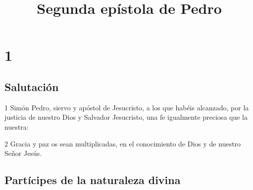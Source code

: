 
\title{Segunda epístola de Pedro}

\chapter{1}

\section*{Salutación}

\par 1 Simón Pedro, siervo y apóstol de Jesucristo, a los que habéis alcanzado, por la justicia de nuestro Dios y Salvador Jesucristo, una fe igualmente preciosa que la nuestra:
\par 2 Gracia y paz os sean multiplicadas, en el conocimiento de Dios y de nuestro Señor Jesús.

\section*{Partícipes de la naturaleza divina}


